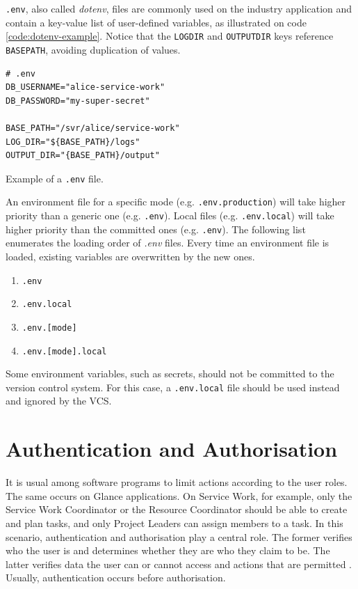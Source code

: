 \texttt{.env}, also called \textit{dotenv}, files are commonly used on the industry application and contain a key-value list of user-defined variables, as illustrated on code \autoref{code:dotenv-example}. Notice that the \texttt{LOG\textunderscore DIR} and \texttt{OUTPUT\textunderscore DIR} keys reference \texttt{BASE\textunderscore PATH}, avoiding duplication of values.

\begin{listing}[htbp]
\begin{verbatim}
# .env
DB_USERNAME="alice-service-work"
DB_PASSWORD="my-super-secret"

BASE_PATH="/svr/alice/service-work"
LOG_DIR="${BASE_PATH}/logs"
OUTPUT_DIR="{BASE_PATH}/output"
\end{verbatim}
\caption{Example of a \texttt{.env} file.}
\label{code:dotenv-example}
\end{listing}

An environment file for a specific mode (e.g. \texttt{.env.production}) will take higher priority than a generic one (e.g. \texttt{.env}). Local files (e.g. \texttt{.env.local}) will take higher priority than the committed ones (e.g. \texttt{.env}). The following list enumerates the loading order of \textit{.env} files. Every time an environment file is loaded, existing variables are overwritten by the new ones.

\begin{enumerate}
    \item \texttt{.env}
    \item \texttt{.env.local}
    \item \texttt{.env.[mode]}
    \item \texttt{.env.[mode].local}
\end{enumerate}

Some environment variables, such as secrets, should not be committed to the version control system. For this case, a \texttt{.env.local} file should be used instead and ignored by the VCS.

\section{Authentication and Authorisation}
\label{sec:frapi-v1-auth}

It is usual among software programs to limit actions according to the user roles. The same occurs on Glance applications. On Service Work, for example, only the Service Work Coordinator or the Resource Coordinator should be able to create and plan tasks, and only Project Leaders can assign members to a task. In this scenario, authentication and authorisation play a central role. The former verifies who the user is and determines whether they are who they claim to be. The latter verifies data the user can or cannot access and actions that are permitted \cite{auth0-authentication-authorization}. Usually, authentication occurs before authorisation.

